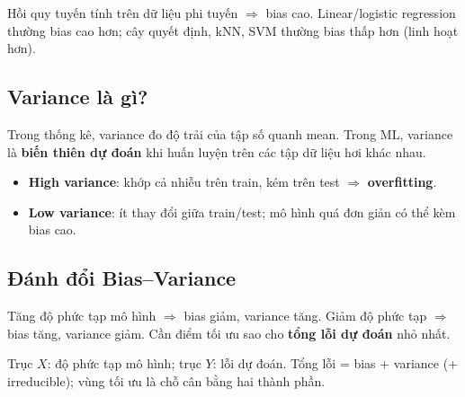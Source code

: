 \begin{phuongphap}[title={Ví dụ mô hình}]
Hồi quy tuyến tính trên dữ liệu phi tuyến $\Rightarrow$ bias cao.
Linear/logistic regression thường bias cao hơn; cây quyết định, kNN, SVM thường bias thấp hơn (linh hoạt hơn).
\end{phuongphap}

\subsection{Variance là gì?}

\begin{dinhnghia}[title={Variance}]
Trong thống kê, variance đo độ trải của tập số quanh mean.
Trong ML, variance là \textbf{biến thiên dự đoán} khi huấn luyện trên các tập dữ liệu hơi khác nhau.
\end{dinhnghia}

\begin{ynghia}[title={High variance vs low variance}]
\begin{itemize}
  \item \textbf{High variance}: khớp cả nhiễu trên train, kém trên test $\Rightarrow$ \textbf{overfitting}.
  \item \textbf{Low variance}: ít thay đổi giữa train/test; mô hình quá đơn giản có thể kèm bias cao.
\end{itemize}
\end{ynghia}

\begin{vidu}[title={Minh hoạ variance cao / thấp}]
\end{vidu}

\subsection{Đánh đổi Bias--Variance}

\begin{ynghia}[title={Cân bằng}]
Tăng độ phức tạp mô hình $\Rightarrow$ bias giảm, variance tăng.
Giảm độ phức tạp $\Rightarrow$ bias tăng, variance giảm.
Cần điểm tối ưu sao cho \textbf{tổng lỗi dự đoán} nhỏ nhất.
\end{ynghia}

\begin{vidu}[title={Đồ thị đánh đổi Bias--Variance}]

Trục $X$: độ phức tạp mô hình; trục $Y$: lỗi dự đoán.
Tổng lỗi = bias + variance (+ irreducible); vùng tối ưu là chỗ cân bằng hai thành phần.
\end{vidu}

